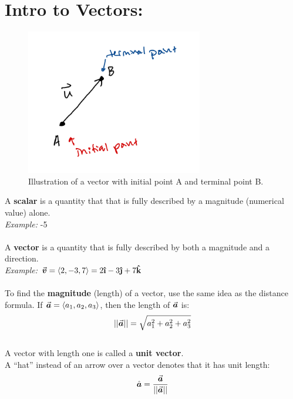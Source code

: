 \section*{Intro to Vectors:}







\begin{figure}[!h]
\centering
\includegraphics[height=2.5in]{vector-intro.png}
\caption{Illustration of a vector with initial point A and terminal point B.}

\end{figure}


\hspace*{.2in}
A \textbf{scalar} is a quantity that that is fully described by a magnitude (numerical value) alone.\\
\textit{ Example:} -5\\~\\
A \textbf{vector} is a quantity that is fully described by both a magnitude and a direction.\\
\textit{ Example: }\(\v = \<2,-3,7\> = 2\ihat -3\jhat+7\khat\)
 \\~\\
To find the \textbf{magnitude} (length) of a vector, use the same idea as the distance formula. If \(\a=\<a_1,a_2,a_3\>\), then the length of \(\a\) is:
\[
||\a|| = \sqrt{a_1^2+a_2^2+a_3^2}
\]
~\\
A vector with length one is called a \textbf{unit vector}. \\
A ``hat'' instead of an arrow over a vector denotes that it has unit length:
\[
\hat{\boldsymbol{a}} = \frac{\a}{||\a||}
\]


